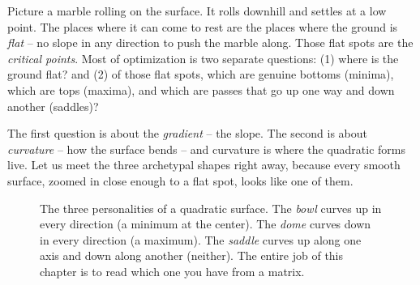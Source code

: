 \begin{intuitionbox}
Picture a marble rolling on the surface. It rolls downhill and settles at a low
point. The places where it can come to rest are the places where the ground is
\emph{flat} -- no slope in any direction to push the marble along. Those flat spots
are the \emph{critical points}. Most of optimization is two separate questions:
(1) where is the ground flat? and (2) of those flat spots, which are genuine
bottoms (minima), which are tops (maxima), and which are passes that go up one way
and down another (saddles)?
\end{intuitionbox}

The first question is about the \emph{gradient} -- the slope. The second is about
\emph{curvature} -- how the surface bends -- and curvature is where the quadratic
forms live. Let us meet the three archetypal shapes right away, because every smooth
surface, zoomed in close enough to a flat spot, looks like one of them.

\begin{figure}[H]
\centering
{}
\hspace{0.1cm}
\hspace{0.1cm}
\caption{The three personalities of a quadratic surface. The \emph{bowl} curves up
in every direction (a minimum at the center). The \emph{dome} curves down in every
direction (a maximum). The \emph{saddle} curves up along one axis and down along
another (neither). The entire job of this chapter is to read which one you have from
a matrix.}
\label{ch36:fig-three-shapes}
\end{figure}

